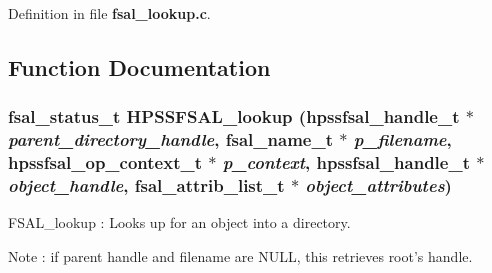 Definition in file {\bf fsal\_\-lookup.c}.

\subsection{Function Documentation}
\subsubsection[{HPSSFSAL\_\-lookup}]{\setlength{\rightskip}{0pt plus 5cm}fsal\_\-status\_\-t HPSSFSAL\_\-lookup (hpssfsal\_\-handle\_\-t $\ast$ {\em parent\_\-directory\_\-handle}, \/  fsal\_\-name\_\-t $\ast$ {\em p\_\-filename}, \/  hpssfsal\_\-op\_\-context\_\-t $\ast$ {\em p\_\-context}, \/  hpssfsal\_\-handle\_\-t $\ast$ {\em object\_\-handle}, \/  fsal\_\-attrib\_\-list\_\-t $\ast$ {\em object\_\-attributes})}\label{fsal__lookup_8c_a856f71db0b4714ff1d475dc9a6ce0eb5}
FSAL\_\-lookup : Looks up for an object into a directory.

Note : if parent handle and filename are NULL, this retrieves root's handle.


